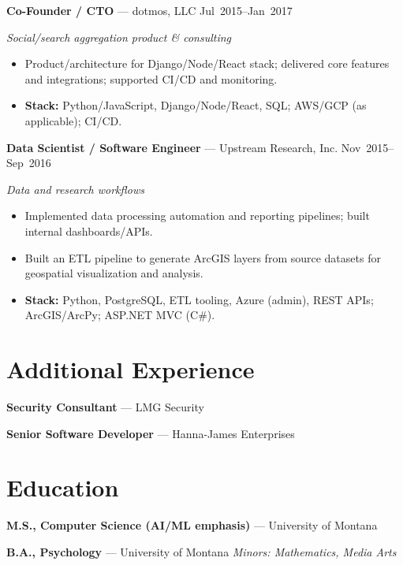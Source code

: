 \documentclass[10pt]{article}
\begin{document}
\noindent\textbf{Co-Founder / CTO} — dotmos, LLC \hfill Jul~2015--Jan~2017\par
\emph{Social/search aggregation product \& consulting}\par
\begin{itemize}
  \item Product/architecture for Django/Node/React stack; delivered core features and integrations; supported CI/CD and monitoring.
  \item \textbf{Stack:} Python/JavaScript, Django/Node/React, SQL; AWS/GCP (as applicable); CI/CD.
\end{itemize}

\noindent\textbf{Data Scientist / Software Engineer} — Upstream Research, Inc. \hfill Nov~2015--Sep~2016\par
\emph{Data and research workflows}\par
\begin{itemize}
  \item Implemented data processing automation and reporting pipelines; built internal dashboards/APIs.
  \item Built an ETL pipeline to generate ArcGIS layers from source datasets for geospatial visualization and analysis.
  \item \textbf{Stack:} Python, PostgreSQL, ETL tooling, Azure (admin), REST APIs; ArcGIS/ArcPy; ASP.NET MVC (C\#).
\end{itemize}

\section*{Additional Experience}
\noindent\textbf{Security Consultant} — LMG Security\par
\noindent\textbf{Senior Software Developer} — Hanna-James Enterprises

\section*{Education}
\textbf{M.S., Computer Science (AI/ML emphasis)} — University of Montana\par
\textbf{B.A., Psychology} — University of Montana \quad \emph{Minors: Mathematics, Media Arts}

\end{document}
